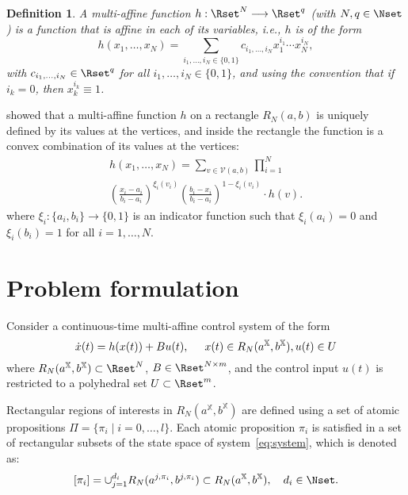 \documentclass{ifacconf}
\newtheorem{definition}{Definition}
\newcommand{\RNset}{R_N(a^{\mathbb{X}},b^{\mathbb{X}})}
\newcommand{\VNset}{\mathcal{V}(a,b)}
\newcommand{\RNab}{R_N(a,b)}
\newcommand{\PREDSET}{\ensuremath{\Pi}}
\begin{document}
\begin{definition}
  \label{def:multiaffine}
  A {\em multi-affine function} $h: \Rset^N \longrightarrow
  \Rset^q$ (with $N,q \in \Nset$) is a function that is affine in
  each of its variables, i.e., $h$ is of the form
  \[h(x_1,\ldots,x_N) = \sum_{i_1,\ldots,i_N \in \{0,1\}}
  c_{i_1,\ldots,i_N} x_1^{i_1} \cdots x_N^{i_N},\]
  with $c_{i_1,\ldots,i_N} \in \Rset^q$ for all $i_1,\ldots,i_N \in
  \{0,1\}$, and using the convention that if $i_k = 0$, then
  $x_k^{i_k} \equiv 1$.
\end{definition}

\cite{Belta-TAC06} showed  that a multi-affine function $h$ on a rectangle $\RNab$ is uniquely defined by its values at the vertices, and inside the rectangle the function is a convex combination of its values at the vertices:
\begin{equation}
  \label{eq:ma_convex}
  \begin{array}{l}
  h(x_1,\ldots,x_N) = \sum_{v \in \VNset} \prod_{i=1}^N \\
\left( \frac{x_i-a_i}{b_i-a_i} \right)^{\xi_i(v_i)} \left(
\frac{b_i-x_i}{b_i-a_i} \right)^{1-\xi_i(v_i)} \cdot h(v).
\end{array}
\end{equation}
where $\xi_i : \{a_i,b_i\} \longrightarrow \{0,1\}$ is an indicator function such that $\xi_i(a_i)=0$ and $\xi_i(b_i)=1$ for all $i=1,\ldots, N$.

\section{Problem formulation}\label{sec:prob}

Consider a continuous-time multi-affine control system of the form
\begin{equation}
  \label{eq:system}
  \dot{x}(t) = h(x(t)) + Bu(t), \hspace*{0.5cm} x(t) \in \RNset, u(t) \in U
\end{equation}
where $\RNset \subset \Rset^N$, $B \in \Rset^{N \times m}$, and the control input $u(t)$ is restricted to a polyhedral set $U \subset \Rset^m$.

Rectangular regions of interests in $\RNset$ are defined using a set of atomic propositions $\PREDSET = \{\pi_i \mid i=0, \ldots, l\}$. Each atomic proposition $\pi_i$ is satisfied in a set of  rectangular subsets of the state space of system~\eqref{eq:system}, which is denoted as:
\begin{equation}\label{eq:atomic_prop}
[\pi_i] = \cup_{j=1}^{d_i} R_N(a^{j,\pi_i},b^{j,\pi_i}) \subset \RNset, \hspace{10pt} d_i \in \Nset. 
\end{equation}
\end{document}

